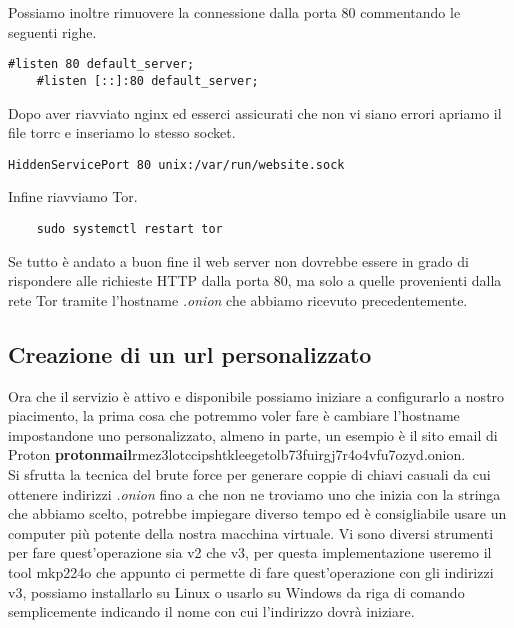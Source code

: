 Possiamo inoltre rimuovere la connessione dalla porta 80 commentando le seguenti righe.
\begin{lstlisting}[caption={Rimozione connessione dalla porta 80 in nginx}]
    #listen 80 default_server;
    #listen [::]:80 default_server;
\end{lstlisting}


Dopo aver riavviato nginx ed esserci assicurati che non vi siano errori apriamo il file torrc e inseriamo lo stesso socket.
\begin{lstlisting}[caption={Aggiunta socket unix a torrc}]
    HiddenServicePort 80 unix:/var/run/website.sock
\end{lstlisting}

Infine riavviamo Tor.
\begin{lstlisting}
    sudo systemctl restart tor
\end{lstlisting}
Se tutto è andato a buon fine il web server non dovrebbe essere in grado di rispondere alle richieste HTTP dalla porta 80, ma solo a quelle provenienti dalla rete Tor tramite l'hostname \emph{.onion} che abbiamo ricevuto precedentemente. \\

\newpage
\subsection{Creazione di un url personalizzato}
Ora che il servizio è attivo e disponibile possiamo iniziare a configurarlo a nostro piacimento, la prima cosa che potremmo voler fare è cambiare l'hostname impostandone uno personalizzato, almeno in parte, un esempio è il sito email di Proton \textbf{protonmail}rmez3lotccipshtkleegetolb73fuirgj7r4o4vfu7ozyd.onion. \\
Si sfrutta la tecnica del brute force per generare coppie di chiavi casuali da cui ottenere indirizzi \emph{.onion} fino a che non ne troviamo uno che inizia con la stringa che abbiamo scelto, potrebbe impiegare diverso tempo ed è consigliabile usare un computer più potente della nostra macchina virtuale. 
Vi sono diversi strumenti per fare quest'operazione sia v2 che v3, per questa implementazione useremo il tool mkp224o \cite{V3AddressGeneratorRepo} che appunto ci permette di fare quest'operazione con gli indirizzi v3, possiamo installarlo su Linux o usarlo su Windows da riga di comando semplicemente indicando il nome con cui l'indirizzo dovrà iniziare.


